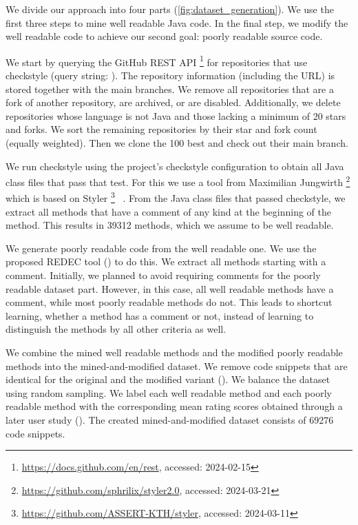 \documentclass[%
class=scrreprt,
chapterprefix=false,%
open=right,%
twoside=true,%
paper=a4,%
logofile={Logo\_zentral\_farbig\_EN.png},%
thesistype=master,%
UKenglish,%
]{se2thesis}
\newcounter{urlfootnote}
\newcommand{\onecurl}[2]{%
	\stepcounter{urlfootnote}%
	\expandafter\def\csname urlfootnote:#1\endcsname{\theurlfootnote}%
	\footnote{\label{url:#1}\url{#1}, accessed: #2}%
}
\newcommand{\curl}[2]{%
		\onecurl{#1}{#2}%
}
\theoremstyle{definition}
\newcommand{\numOriginal}{39312\xspace}
\newcommand{\numSamplesAccurate}{69276\xspace}
\newcommand{\rdh}{REDEC\xspace}
\begin{document}
	We divide our approach into four parts (\autoref{fig:dataset_generation}). We use the first three steps to mine well readable Java code. In the final step, we modify the well readable code to achieve our second goal: poorly readable source code.
	
	We start by querying the GitHub REST API\curl{https://docs.github.com/en/rest}{2024-02-15} for repositories that use checkstyle (query string: ). The repository information (including the URL) is stored together with the main branches.
	We remove all repositories that are a fork of another repository, are archived, or are disabled.
	Additionally, we delete repositories whose language is not Java and those lacking a minimum of 20 stars and forks.
	We sort the remaining repositories by their star and fork count (equally weighted). Then we clone the 100 best and check out their main branch.
	
	We run checkstyle using the project's checkstyle configuration to obtain all Java class files that pass that test. For this we use a tool from Maximilian Jungwirth\curl{https://github.com/sphrilix/styler2.0}{2024-03-21} which is based on Styler\curl{https://github.com/ASSERT-KTH/styler}{2024-03-11}~\cite{loriot2022styler}.
	From the Java class files that passed checkstyle, we extract all methods that have a comment of any kind at the beginning of the method. This results in \numOriginal methods, which we assume to be well readable.
	
	We generate poorly readable code from the well readable one. We use the proposed \rdh tool () to do this. We extract all methods starting with a comment.
    Initially, we planned to avoid requiring comments for the poorly readable dataset part. However, in this case, all well readable methods have a comment, while most poorly readable methods do not. This leads to shortcut learning, whether a method has a comment or not, instead of learning to distinguish the methods by all other criteria as well.
	
	We combine the mined well readable methods and the modified poorly readable methods into the mined-and-modified dataset. We remove code snippets that are identical for the original and the modified variant (). We balance the dataset using random sampling.
	We label each well readable method and each poorly readable method with the corresponding mean rating scores obtained through a later user study ().
	The created mined-and-modified dataset consists of \numSamplesAccurate code snippets.
	
\end{document}
